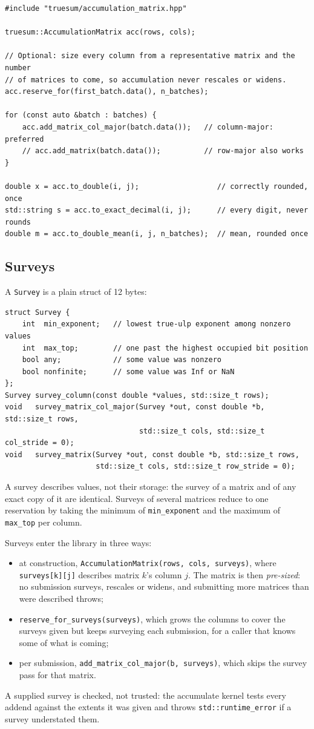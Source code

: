 \documentclass[11pt]{article}
\newcommand{\code}[1]{\texttt{#1}}
\begin{document}
\begin{lstlisting}
#include "truesum/accumulation_matrix.hpp"

truesum::AccumulationMatrix acc(rows, cols);

// Optional: size every column from a representative matrix and the number
// of matrices to come, so accumulation never rescales or widens.
acc.reserve_for(first_batch.data(), n_batches);

for (const auto &batch : batches) {
    acc.add_matrix_col_major(batch.data());   // column-major: preferred
    // acc.add_matrix(batch.data());          // row-major also works
}

double x = acc.to_double(i, j);                  // correctly rounded, once
std::string s = acc.to_exact_decimal(i, j);      // every digit, never rounds
double m = acc.to_double_mean(i, j, n_batches);  // mean, rounded once
\end{lstlisting}

\subsection{Surveys}

A \code{Survey} is a plain struct of 12 bytes:
\begin{lstlisting}
struct Survey {
    int  min_exponent;   // lowest true-ulp exponent among nonzero values
    int  max_top;        // one past the highest occupied bit position
    bool any;            // some value was nonzero
    bool nonfinite;      // some value was Inf or NaN
};
Survey survey_column(const double *values, std::size_t rows);
void   survey_matrix_col_major(Survey *out, const double *b, std::size_t rows,
                               std::size_t cols, std::size_t col_stride = 0);
void   survey_matrix(Survey *out, const double *b, std::size_t rows,
                     std::size_t cols, std::size_t row_stride = 0);
\end{lstlisting}
A survey describes values, not their storage: the survey of a matrix and of any exact copy of it are identical. Surveys of several matrices reduce to one reservation by taking the minimum of \code{min\_exponent} and the maximum of \code{max\_top} per column.

Surveys enter the library in three ways:
\begin{itemize}
\item at construction, \code{AccumulationMatrix(rows, cols, surveys)}, where \code{surveys[k][j]} describes matrix $k$'s column $j$. The matrix is then \emph{pre-sized}: no submission surveys, rescales or widens, and submitting more matrices than were described throws;
\item \code{reserve\_for\_surveys(surveys)}, which grows the columns to cover the surveys given but keeps surveying each submission, for a caller that knows some of what is coming;
\item per submission, \code{add\_matrix\_col\_major(b, surveys)}, which skips the survey pass for that matrix.
\end{itemize}
A supplied survey is checked, not trusted: the accumulate kernel tests every addend against the extents it was given and throws \code{std::runtime\_error} if a survey understated them.
\end{document}
